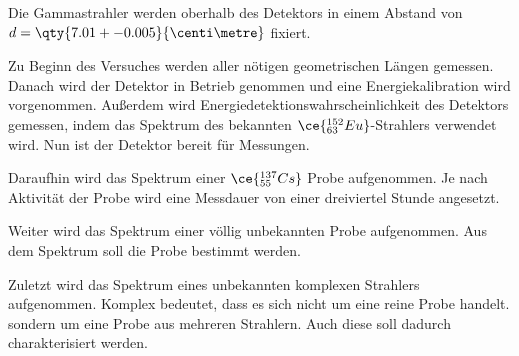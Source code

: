 Die Gammastrahler werden oberhalb des Detektors in einem Abstand von $d = \qty{7.01 +- 0.005}{\centi\metre}$ fixiert.

Zu Beginn des Versuches werden aller nötigen geometrischen Längen gemessen. Danach wird der Detektor in Betrieb genommen und eine Energiekalibration wird vorgenommen. Außerdem wird 
Energiedetektionswahrscheinlichkeit des Detektors gemessen, indem das Spektrum des bekannten $\ce{^{152}_{63}Eu}$-Strahlers verwendet wird. Nun ist der Detektor bereit für 
Messungen. 

Daraufhin wird das Spektrum einer $\ce{^{137}_{55}Cs}$ Probe aufgenommen. Je nach Aktivität der Probe wird eine Messdauer von einer dreiviertel Stunde angesetzt. 

Weiter wird das Spektrum einer völlig unbekannten Probe aufgenommen. Aus dem Spektrum soll die Probe bestimmt werden. 

Zuletzt wird das Spektrum eines unbekannten komplexen Strahlers aufgenommen. Komplex bedeutet, dass es sich nicht um eine reine Probe handelt. sondern um eine Probe aus mehreren 
Strahlern. Auch diese soll dadurch charakterisiert werden. 
